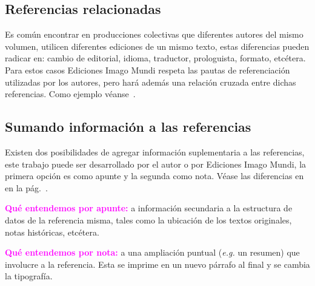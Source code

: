 \documentclass{book}
\begin{document}
{{{{{{{{%
\begin{mdframed}[linewidth=.5pt,linecolor=black!30,roundcorner=3pt,backgroundcolor=yellow!15]
\noindent\vspace{-12pt}
\printbibliography[keyword=particula,heading=none]
\end{mdframed}

\subsection{Referencias relacionadas}

Es común encontrar en producciones colectivas que diferentes autores del mismo volumen, utilicen diferentes ediciones de un mismo texto, estas diferencias pueden radicar en: cambio de editorial, idioma, traductor, prologuista, formato, etcétera. Para estos casos Ediciones Imago Mundi respeta las pautas de referenciación utilizadas por los autores, pero hará además una relación cruzada entre dichas referencias. Como ejemplo véanse~\textcite{Dadrian2008,Dadrian1997}.

\begin{mdframed}[linewidth=.5pt,linecolor=black!30,roundcorner=3pt,backgroundcolor=yellow!15]
\noindent\vspace{-12pt}
\printbibliography[keyword=relacionada,heading=none]
\end{mdframed}

\subsection{Sumando información a las referencias}

Existen dos posibilidades de agregar información suplementaria a las referencias, este trabajo puede ser desarrollado por el autor o por Ediciones Imago Mundi, la primera opción es como apunte y la segunda como nota. Véase las diferencias en~\textcite{VVAA2002,Lenin1974} en la pág.~\pageref{pagina18}.

\begin{compactdesc}
\item [\textcolor{magenta}{\textbf{Qué entendemos por apunte:}}] a información secundaria a la estructura de datos de la referencia misma, tales como la ubicación de los textos originales, notas históricas, etcétera.
\item [\textcolor{magenta}{\textbf{Qué entendemos por nota:}}] a una ampliación puntual (\emph{e.g.} un resumen) que involucre a la referencia. Esta se imprime en un nuevo párrafo al final y se cambia la tipografía.
\end{compactdesc}

}}}}}}}}
\end{document}
